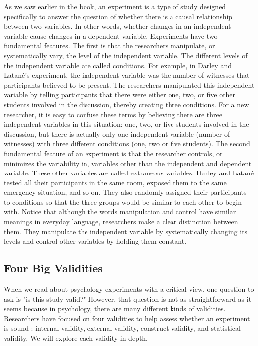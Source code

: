  As we saw earlier in the book, an experiment is a type of study designed specifically to answer the question of whether there is a causal relationship between two variables. In other words, whether changes in an independent variable cause changes in a dependent variable. Experiments have two fundamental features. The first is that the researchers manipulate, or systematically vary, the level of the independent variable. The different levels of the independent variable are called conditions. For example, in Darley and Latan\'e's experiment, the independent variable was the number of witnesses that participants believed to be present. The researchers manipulated this independent variable by telling participants that there were either one, two, or five other students involved in the discussion, thereby creating three conditions. For a new researcher, it is easy to confuse these terms by believing there are three independent variables in this situation: one, two, or five students involved in the discussion, but there is actually only one independent variable (number of witnesses) with three different conditions (one, two or five students). The second fundamental feature of an experiment is that the researcher controls, or minimizes the variability in, variables other than the independent and dependent variable. These other variables are called extraneous variables. Darley and Latan\'e tested all their participants in the same room, exposed them to the same emergency situation, and so on. They also randomly assigned their participants to conditions so that the three groups would be similar to each other to begin with. Notice that although the words manipulation and control have similar meanings in everyday language, researchers make a clear distinction between them. They manipulate the independent variable by systematically changing its levels and control other variables by holding them constant.
 
 \subsection{Four Big Validities}
 
 When we read about psychology experiments with a critical view, one question to ask is "is this study valid?" However, that question is not as straightforward as it seems because in psychology, there are many different kinds of validities. Researchers have focused on four validities to help assess whether an experiment is sound \citep{kenny_estimating_1981,morling_guide_2014}: internal validity, external validity, construct validity, and statistical validity. We will explore each validity in depth.
 

